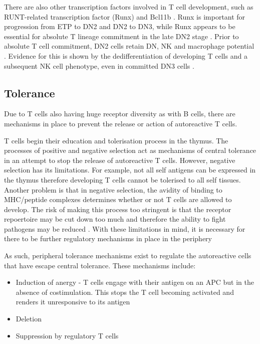 There are also other transcription factors involved in T cell development, such as RUNT-related transcription factor (Runx) and Bcl11b \citep{Naito2011}.
Runx is important for progression from ETP to DN2 and DN2 to DN3, while Runx appears to be essential for absolute T lineage commitment in the late DN2 stage \citep{Liu2010, Naito2011}. 
Prior to absolute T cell commitment, DN2 cells retain DN, NK and macrophage potential \citep{Naito2011}.
Evidence for this is shown by the dedifferentiation of developing T cells and a subsequent NK cell phenotype, even in committed DN3 cells \citep{Liu2010}.




\subsection{Tolerance}

Due to T cells also having huge receptor diversity as with B cells, there are mechanisms in place to prevent the release or action of autoreactive T cells.

T cells begin their education and tolerisation process in the thymus.
The processes of positive and negative selection act as mechanisms of central tolerance in an attempt to stop the release of autoreactive T cells\citep{Walker2002}.
However, negative selection has its limitations.
For example, not all self antigens can be expressed in the thymus therefore developing T cells cannot be tolerised to all self tissues.
Another problem is that in negative selection, the avidity of binding to MHC/peptide complexes determines whether or not T cells are allowed to develop.
The risk of making this process too stringent is that the receptor repoertoire may be cut down too much and therefore the ability to fight pathogens may be reduced \citep{Walker2002}.
With these limitations in mind, it is necessary for there to be further regulatory mechanisms in place in the periphery

As such, peripheral tolerance mechanisms exist to regulate the autoreactive cells that have escape central tolerance.
These mechanisms include:
\begin{itemize}
\item Induction of anergy - T cells engage with their antigen on an APC but in the absence of costimulation. This stops the T cell becoming activated and renders it unresponsive to its antigen\citep{Abbas2004}
\item Deletion\citep{Abbas2004}
\item Suppression by regulatory T cells\citep{Abbas2004}
\end{itemize}

